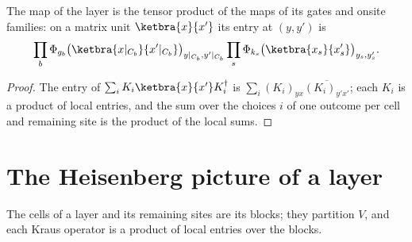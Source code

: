 \begin{lemma}
    \label{lem:circuits_layer_entry}
    \leanok
    The map of the layer is the tensor product of the maps of its gates and onsite families: on a
    matrix unit $\ketbra{x}{x'}$ its entry at $(y,y')$ is
    \begin{align}
        \prod_b\Phi_{g_b}\bigl(\ketbra{x|_{C_b}}{x'|_{C_b}}\bigr)_{y|_{C_b},y'|_{C_b}}
        \prod_s\Phi_{k_s}\bigl(\ketbra{x_s}{x'_s}\bigr)_{y_s,y'_s}.
        \notag
    \end{align}
\end{lemma}
\begin{proof}\leanok
    The entry of $\sum_iK_i\ketbra{x}{x'}K_i^\dagger$ is
    $\sum_i(K_i)_{yx}\overline{(K_i)_{y'x'}}$; each $K_i$ is a product of local entries, and
    the sum over the choices $i$ of one outcome per cell and remaining site is the product
    of the local sums.
\end{proof}

\section{The Heisenberg picture of a layer}
\label{sec:circuits_layer_dual}

The cells of a layer and its remaining sites are its blocks; they partition $V$,
and each Kraus operator is a product of local entries over the blocks.

